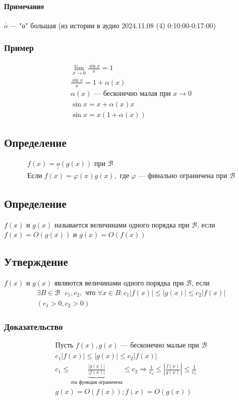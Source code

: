 \documentclass{article}
\begin{document}
\paragraph{Примечание}
$\overline{\overline{o}}$ --- "о"  большая (из истории в аудио 2024.11.08 (4) 0:10:00-0:17:00)

\subsubsection{Пример}
\begin{gather*}
    \lim_{x \to 0} \frac{\sin x}{x} = 1 \\
    \frac{\sin x}{x} = 1 + \alpha(x) \\
    \alpha(x) \text{ --- бесконечно малая при } x \to 0 \\
    \sin x = x + \alpha(x)x \\
    \sin x = x(1 + \alpha(x))
\end{gather*}


\subsection{Определение}
\begin{gather*}
    f(x) = \underline{\underline{o}}(g(x)) \text{ при } \mathcal{B} \\
    \text{Если } f(x) = \varphi(x)g(x), \text{ где } \varphi \text{ --- финально ограничена при } \mathcal{B}
\end{gather*}


\subsection{Определение}
$f(x)$ и $g(x)$ называется величинами одного порядка при $\mathcal{B}$, если
$f(x) = O(g(x))$ и $g(x) = O(f(x))$


\subsection{Утверждение}
$f(x)$ и $g(x)$ являются величинами одного порядка при $\mathcal{B}$, если
\begin{gather*}
    \exists B\in \mathcal{B} ~~~ c_1, c_2, \text{ что } \forall x \in B: c_1|f(x)| \le |g(x)| \le c_2|f(x)| \\
    (c_1 > 0, c_2 > 0)
\end{gather*}

\subsubsection{Доказательство}
\begin{gather*}
    \text{Пусть } f(x), g(x) \text{ --- бесконечно малые при } \mathcal{B} \\
    c_1|f(x)| \le |g(x)| \le c_2|f(x)| \\
    c_1 \le \underbrace{\frac{|g(x)|}{|f(x)|}}_{\text{эта функция ограничена}} \le c_2 
    \Rightarrow \frac{1}{c_2} \le |\frac{f(x)}{g(x)}| \le \frac{1}{c_1} \\
    g(x) = O(f(x)); f(x) = O(g(x))
\end{gather*}
\end{document}

